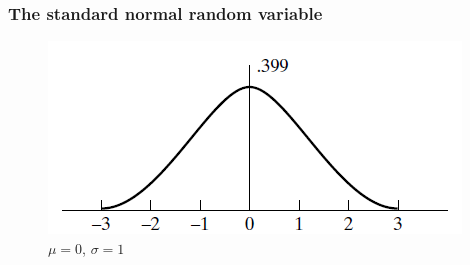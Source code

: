 \subsubsection*{The standard normal random variable}
	\begin{figure}[htp]
	\begin{center}
		\includegraphics[scale=0.8]{figure4}
	\end{center}
	\label{reffig4}
	\caption{$\mu=0$, $\sigma=1$}
\end{figure}

